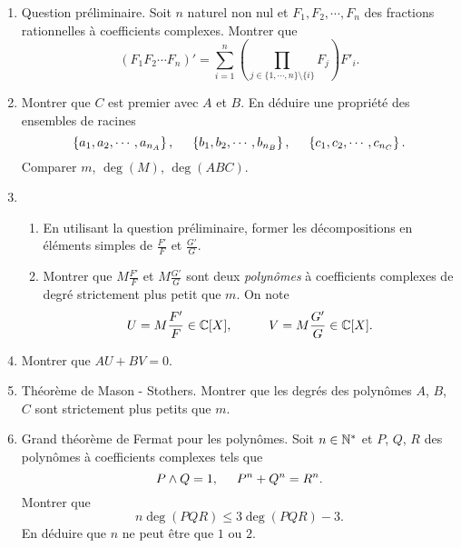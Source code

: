 \begin{enumerate}
 \item Question préliminaire. Soit $n$ naturel non nul et $F_1,F_2,\cdots,F_n$ des fractions rationnelles à coefficients complexes. Montrer que
\begin{displaymath}
 \left( F_1F_2\cdots F_n\right)' =
\sum_{i=1}^{n}\left( \prod_{j\in\{1,\cdots,n\}\setminus\{i\}}F_j\right)F'_i  .
\end{displaymath}
\item Montrer que $C$ est premier avec $A$ et $B$. En déduire une propriété des ensembles de racines
\begin{displaymath}
 \left\lbrace a_1,a_2,\cdots, a_{n_A}\right\rbrace,\hspace{0.5cm} 
 \left\lbrace b_1,b_2,\cdots, b_{n_B}\right\rbrace,\hspace{0.5cm}
 \left\lbrace c_1,c_2,\cdots, c_{n_C}\right\rbrace .
\end{displaymath}
Comparer $m$, $\deg(M)$, $\deg(ABC)$.
\item 
\begin{enumerate}
 \item En utilisant la question préliminaire, former les décompositions en éléments simples de $\frac{F'}{F}$ et $\frac{G'}{G}$.
 \item Montrer que $M\frac{F'}{F}$ et $M\frac{G'}{G}$ sont deux \emph{polynômes} à coefficients complexes de degré strictement plus petit que $m$. On note
\begin{displaymath}
 U = M\frac{F'}{F}\in \mathbb{C}[X],\hspace{1cm} V=M\frac{G'}{G}\in \mathbb{C}[X].
\end{displaymath}
\end{enumerate}

\item Montrer que $AU+BV = 0$.

\item Théorème de Mason - Stothers.\newline
Montrer que les degrés des polynômes $A$, $B$, $C$ sont strictement plus petits que $m$.

\item Grand théorème de Fermat pour les polynômes.\newline
Soit $n \in \mathbb{N}^*$ et $P$, $Q$, $R$ des polynômes à coefficients complexes tels que 
\begin{displaymath}
P\wedge Q = 1, \hspace{0.5cm} P^n + Q^n = R^n.
\end{displaymath}
Montrer que
\begin{displaymath}
 n\deg(PQR) \leq 3\deg(PQR) -3 .
\end{displaymath}
En déduire que $n$ ne peut être que $1$ ou $2$.
\end{enumerate}
